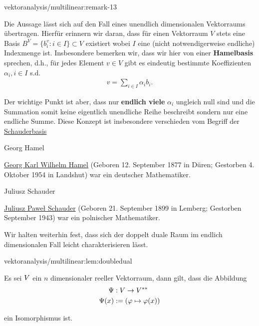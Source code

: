 \begin{remark}{}{vektoranalysis/multilinear:remark-13}



\par
Die Aussage lässt sich auf den Fall eines unendlich dimensionalen Vektorraums übertragen. Hierfür erinnern wir daran, dass für einen Vektorraum \(V\) stets eine Basis \(B^V = \{b_i^v:i\in I\}\subset V\) existiert wobei \(I\) eine (nicht notwendigerweise endliche) Indexmenge ist. Insbesondere bemerken wir, dass wir hier von einer \textbf{Hamelbasis} sprechen, d.h., für jedes Element \(v\in V\) gibt es eindeutig bestimmte Koeffizienten \(\alpha_i, i\in I\) s.d.
\begin{align*}
v = \sum_{i\in I} \alpha_i b_i.
\end{align*}
\par
Der wichtige Punkt ist aber, dass nur \textbf{endlich viele} \(\alpha_i\) ungleich null sind und die Summation somit keine eigentlich unendliche Reihe beschreibt sondern nur eine endliche Summe. Diese Konzept ist insbesondere verschieden vom Begriff der \href{https://de.wikipedia.org/wiki/Schauderbasis}{Schauderbasis}
\end{remark}

\begin{emphBox}{Georg Hamel}{}

\par
\href{https://de.wikipedia.org/wiki/Georg\_Hamel}{Georg Karl Wilhelm Hamel} (Geboren 12. September 1877 in Düren; Gestorben 4. Oktober 1954 in Landshut) war ein deutscher Mathematiker.
\end{emphBox}

\begin{emphBox}{Juliusz Schauder}{}

\par
\href{https://de.wikipedia.org/wiki/Juliusz\_Schauder}{Juliusz Paweł Schauder} (Geboren 21. September 1899 in Lemberg; Gestorben September 1943) war ein polnischer Mathematiker.
\end{emphBox}

\par
Wir halten weiterhin fest, dass sich der doppelt duale Raum im endlich dimensionalen Fall leicht charakterisieren lässt.
\begin{lemma}{}{vektoranalysis/multilinear:lem:doubledual}



\par
Es sei \(V\) ein \(n\) dimensionaler reeller Vektorraum, dann gilt, dass die Abbildung
\begin{align*}
\Psi&:V\rightarrow V^{\ast\ast}\\
\Psi(x)&:= (\varphi\mapsto \varphi(x))
\end{align*}
\par
ein Isomorphismus ist.
\end{lemma}


